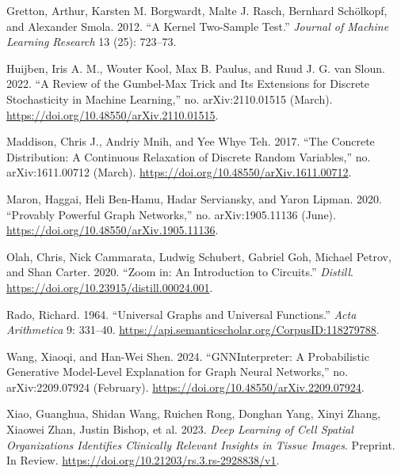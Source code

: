 \documentclass[
  11pt,
  letterpaper,
]{article}
\newlength{\cslhangindent}
\newlength{\cslentryspacingunit} %
\newenvironment{CSLReferences}[2] %
 {%
  \setlength{\parindent}{0pt}
  \ifodd #1
  \let\oldpar\par
  \def\par{\hangindent=\cslhangindent\oldpar}
  \fi
  \setlength{\parskip}{#2\cslentryspacingunit}
 }%
 {}
\begin{document}
\begin{CSLReferences}{1}{0}
\leavevmode{}%
Gretton, Arthur, Karsten M. Borgwardt, Malte J. Rasch, Bernhard
Schölkopf, and Alexander Smola. 2012. {``A Kernel Two-Sample Test.''}
\emph{Journal of Machine Learning Research} 13 (25): 723--73.

\leavevmode{}%
Huijben, Iris A. M., Wouter Kool, Max B. Paulus, and Ruud J. G. van
Sloun. 2022. {``A Review of the Gumbel-Max Trick and Its Extensions for
Discrete Stochasticity in Machine Learning,''} no. arXiv:2110.01515
(March). \url{https://doi.org/10.48550/arXiv.2110.01515}.

\leavevmode{}%
Maddison, Chris J., Andriy Mnih, and Yee Whye Teh. 2017. {``The Concrete
Distribution: A Continuous Relaxation of Discrete Random Variables,''}
no. arXiv:1611.00712 (March).
\url{https://doi.org/10.48550/arXiv.1611.00712}.

\leavevmode{}%
Maron, Haggai, Heli Ben-Hamu, Hadar Serviansky, and Yaron Lipman. 2020.
{``Provably Powerful Graph Networks,''} no. arXiv:1905.11136 (June).
\url{https://doi.org/10.48550/arXiv.1905.11136}.

\leavevmode{}%
Olah, Chris, Nick Cammarata, Ludwig Schubert, Gabriel Goh, Michael
Petrov, and Shan Carter. 2020. {``Zoom in: An Introduction to
Circuits.''} \emph{Distill}.
\url{https://doi.org/10.23915/distill.00024.001}.

\leavevmode{}%
Rado, Richard. 1964. {``Universal Graphs and Universal Functions.''}
\emph{Acta Arithmetica} 9: 331--40.
\url{https://api.semanticscholar.org/CorpusID:118279788}.

\leavevmode{}%
Wang, Xiaoqi, and Han-Wei Shen. 2024. {``GNNInterpreter: A Probabilistic
Generative Model-Level Explanation for Graph Neural Networks,''} no.
arXiv:2209.07924 (February).
\url{https://doi.org/10.48550/arXiv.2209.07924}.

\leavevmode{}%
Xiao, Guanghua, Shidan Wang, Ruichen Rong, Donghan Yang, Xinyi Zhang,
Xiaowei Zhan, Justin Bishop, et al. 2023. \emph{Deep Learning of Cell
Spatial Organizations Identifies Clinically Relevant Insights in Tissue
Images}. Preprint. In Review.
\url{https://doi.org/10.21203/rs.3.rs-2928838/v1}.


\end{CSLReferences}
\end{document}
